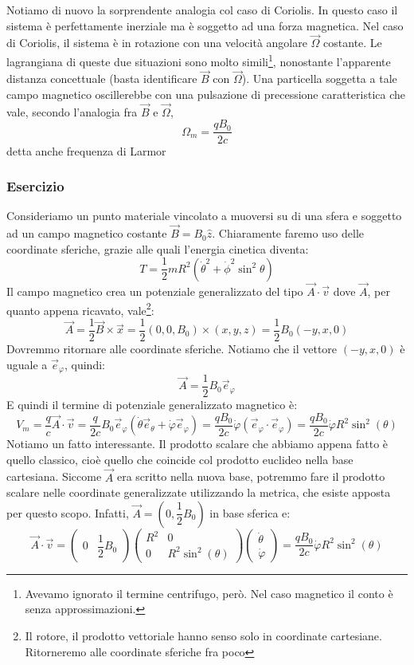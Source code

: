 \documentclass[a4paper,openany]{article}
\begin{document}
	Notiamo di nuovo la sorprendente analogia col caso di Coriolis. In questo caso il sistema è perfettamente inerziale ma è soggetto ad una forza magnetica. Nel caso di Coriolis, il sistema è in rotazione con una velocità angolare $\vec{\Omega}$ costante. Le lagrangiana di queste due situazioni sono molto simili\footnote{Avevamo ignorato il termine centrifugo, però. Nel caso magnetico il conto è senza approssimazioni.}, nonostante l'apparente distanza concettuale (basta identificare $\vec{B}$ con $\vec{\Omega}$). Una particella soggetta a tale campo magnetico oscillerebbe con una pulsazione di precessione caratteristica che vale, secondo l'analogia fra $\vec{B}$ e $\vec{\Omega}$,
	$$
	\Omega_m = \dfrac{qB_0}{2c}
	$$
	detta anche frequenza di Larmor
	\subsubsection{Esercizio}
	Consideriamo un punto materiale vincolato a muoversi su di una sfera e soggetto ad un campo magnetico costante $\vec{B} = B_0 \hat{z}$. Chiaramente faremo uso delle coordinate sferiche, grazie alle quali l'energia cinetica diventa:
	$$
	T = \dfrac{1}{2}mR^2(\dot{\theta}^2+\dot{\phi}^2\sin^2\theta)
	$$
	Il campo magnetico crea un potenziale generalizzato del tipo $\vec{A}\cdot\vec{v}$ dove $\vec{A}$, per quanto appena ricavato, vale\footnote{Il rotore, il prodotto vettoriale hanno senso solo in coordinate cartesiane. Ritorneremo alle coordinate sferiche fra poco}:
	$$
	\vec{A} = \dfrac{1}{2}\vec{B}\times\vec{x} = \dfrac{1}{2}(0,0,B_0)\times(x,y,z) =\dfrac{1}{2}B_0 (-y,x,0)
	$$
	Dovremmo ritornare alle coordinate sferiche. Notiamo che il vettore $(-y,x,0)$ è uguale a $\vec{e}_\varphi$, quindi:
	$$
	\vec{A} = \dfrac{1}{2}B_0\vec{e}_\varphi
	$$
	E quindi il termine di potenziale generalizzato magnetico è:
	$$
	V_m = \dfrac{q}{c}\vec{A}\cdot\vec{v} = \dfrac{q}{2c}B_0\vec{e}_\varphi(\dot{\theta}\vec{e}_\theta + \dot{\varphi}\vec{e}_\varphi) = \dfrac{qB_0}{2c}\dot{\varphi} (\vec{e}_\varphi\cdot\vec{e}_\varphi) = \dfrac{qB_0}{2c}\dot{\varphi}R^2\sin^2(\theta)
	$$
	Notiamo un fatto interessante. Il prodotto scalare che abbiamo appena fatto è quello classico, cioè quello che coincide col prodotto euclideo nella base cartesiana. Siccome $\vec{A}$ era scritto nella nuova base, potremmo fare il prodotto scalare nelle coordinate generalizzate utilizzando la metrica, che esiste apposta per questo scopo. Infatti, $\vec{A} = (0,\dfrac{1}{2}B_0)$ in base sferica e:
	\begin{equation}
		\vec{A}\cdot\vec{v} = 
		\begin{pmatrix}
			0 &
			\dfrac{1}{2}B_0
		\end{pmatrix}
		\begin{pmatrix}
			R^2 & 0 \\
			0 & R^2 \sin^2(\theta)
		\end{pmatrix}
		\begin{pmatrix}
			\dot{\theta} \\
			\dot{\varphi}
		\end{pmatrix}
		= \dfrac{qB_0}{2c}\dot{\varphi}R^2\sin^2(\theta)
	\end{equation}
\end{document}
